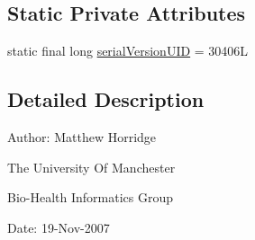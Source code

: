 \subsection*{Static Private Attributes}
\begin{DoxyCompactItemize}
\item 
static final long \hyperlink{classorg_1_1coode_1_1owlapi_1_1manchesterowlsyntax_1_1_manchester_o_w_l_syntax_parser_exception_a99de5a75fa53b369f50487df5f1b396a}{serial\-Version\-U\-I\-D} = 30406\-L
\end{DoxyCompactItemize}


\subsection{Detailed Description}
Author\-: Matthew Horridge\par
 The University Of Manchester\par
 Bio-\/\-Health Informatics Group\par
 Date\-: 19-\/\-Nov-\/2007\par
\par
 


